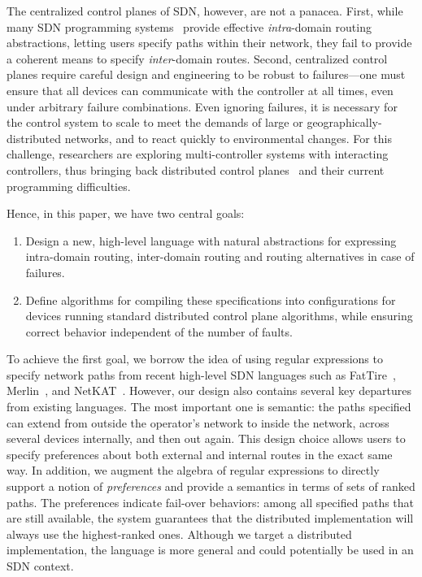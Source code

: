 \documentclass{sig-alternate-10pt}
\begin{document}
The centralized control planes of SDN, however, are not a panacea.
First, while many SDN programming systems~\cite{sdn-languages} provide effective \emph{intra}-domain routing
abstractions, letting users specify paths within their network,
they fail to provide a coherent means to specify \emph{inter}-domain routes.
Second, centralized control planes
require careful design and engineering to be robust to failures---one must ensure that all devices can communicate with the controller at all times, even under arbitrary failure combinations. Even ignoring failures, it is necessary for the control system to
scale to meet the demands of large or geographically-distributed networks,
and to react quickly
to environmental changes. For this challenge, researchers are exploring
multi-controller systems with interacting controllers, thus bringing back distributed
control planes~\cite{mccauley2013extending,onos} and their current programming difficulties.

Hence, in this paper, we have two central goals:
\begin{enumerate}
\item Design a new, high-level language with natural abstractions
for expressing intra-domain routing, inter-domain
routing and routing alternatives in case of failures.
\item Define algorithms for compiling these specifications into
configurations for devices running standard
distributed control plane algorithms, while ensuring correct behavior
independent of the number of faults.
\end{enumerate}

To achieve the first goal, we borrow the idea of using regular
expressions to specify network paths from
recent high-level SDN languages such as FatTire~\cite{fattire},
Merlin~\cite{foster:merlin}, and
NetKAT~\cite{netkat}.  However, our design also contains several key
departures from existing languages.  The most important one is semantic:  the paths specified
can extend from outside the operator's network to inside
the network, across several devices internally, and then out again. This design
choice allows users to specify preferences about both external and internal
routes in the exact same way.
In addition, we augment the algebra
of regular expressions to directly support a notion of {\em preferences} and provide a semantics in terms of sets of ranked paths. The preferences indicate fail-over behaviors:  among all specified paths that are still available,
the system guarantees that the distributed implementation will always use the highest-ranked ones.
Although we target a distributed implementation, the language is more general and could potentially be used in an SDN context.
\end{document}
